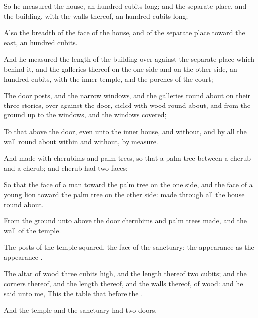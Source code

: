 {So he
measured the
house, an
hundred
cubits
long; and the separate
place, and the
building, with the
walls thereof, an
hundred
cubits
long;

Also the
breadth of the
face of the
house, and of the separate
place toward the
east, an
hundred
cubits.

And he
measured the
length of the
building over
against the separate
place which
{}
behind it, and the
galleries thereof on the one side and on the other side, an
hundred
cubits, with the
inner
temple, and the
porches of the
court;

The door
posts, and the
narrow
windows, and the
galleries round
about on their three
stories, over
against the
door,
cieled with
wood round
about, and from the
ground up to the
windows, and the
windows
{}
covered;

To that above the
door, even unto the
inner
house, and
without, and by all the
wall round
about
within and
without, by
measure.

And
{}
made with
cherubims and palm
trees, so that a palm
tree
{} between a
cherub and a
cherub; and
{}
cherub had
two
faces;

So that the
face of a
man
{} toward the palm
tree on the one side, and the
face of a young
lion toward the palm
tree on the other side:
{}
made through all the
house round
about.

From the
ground unto above the
door
{}
cherubims and palm
trees
made, and
{} the
wall of the
temple.

The
posts of the
temple
{}
squared,
{} the
face of the
sanctuary; the
appearance
{} as the
appearance
{}.

The
altar of
wood
{}
three
cubits
high, and the
length thereof
two
cubits; and the
corners thereof, and the
length thereof, and the
walls thereof,
{} of
wood: and he
said unto me, This
{} the
table that
{}
before the
{}.

And the
temple and the
sanctuary had
two
doors.

}
